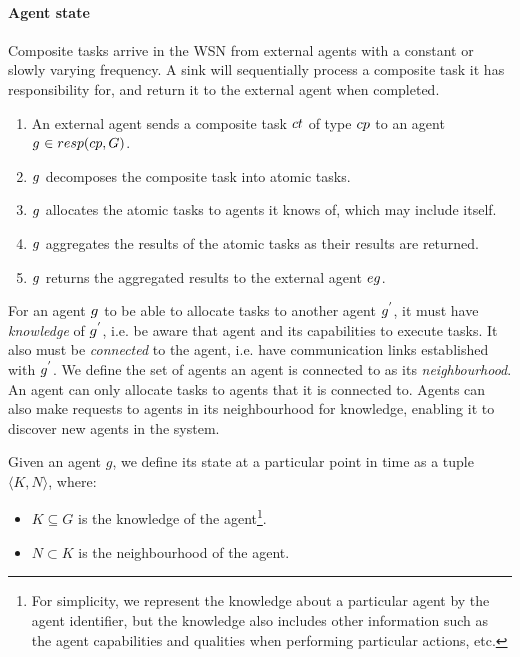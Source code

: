 \paragraph{Agent state}

Composite tasks arrive in the WSN from external agents with a constant or slowly varying frequency. A sink will sequentially process a composite task it has responsibility for, and return it to the external agent when completed.
\begin{enumerate}
	\item An external agent sends a composite task $\varCompositeTask{}{}$ of type $\varCompositeTaskType{}{}$ to an agent $\varAgent{}{} \in \functionTaskResponsibilities{}{}$. 
	\item $g_{}^{}$ decomposes the composite task into atomic tasks.
	\item $g_{}^{}$ allocates the atomic tasks to agents it knows of, which may include itself.
	\item $g_{}^{}$ aggregates the results of the atomic tasks as their results are returned.
	\item $g_{}^{}$ returns the aggregated results to the external agent $\varExternalAgent{}{}$.
\end{enumerate}

For an agent $g_{}^{}$ to be able to allocate tasks to another agent $g_{}^{'}$, it must have \textit{knowledge} of $g_{}^{'}$, i.e. be aware that agent and its capabilities to execute tasks. It also must be \textit{connected} to the agent, i.e. have communication links established with $g_{}^{'}$. We define the set of agents an agent is connected to as its \textit{neighbourhood}. An agent can only allocate tasks to agents that it is connected to. Agents can also make requests to agents in its neighbourhood for knowledge, enabling it to discover new agents in the system.
 

\begin{definition}
	\label{def:agent-state}
	Given an agent $g$, we define its state at a particular point in time as a tuple $\langle K, N\rangle$, where:
	\begin{itemize}
		\item $K\subseteq G$ is the knowledge of the agent\footnote{For simplicity, we represent the knowledge about a particular agent by the agent identifier, but the knowledge also includes other information such as the agent capabilities and qualities when performing particular actions, etc. }.
		\item $N\subset K$ is the neighbourhood of the agent.
	\end{itemize}
\end{definition}

